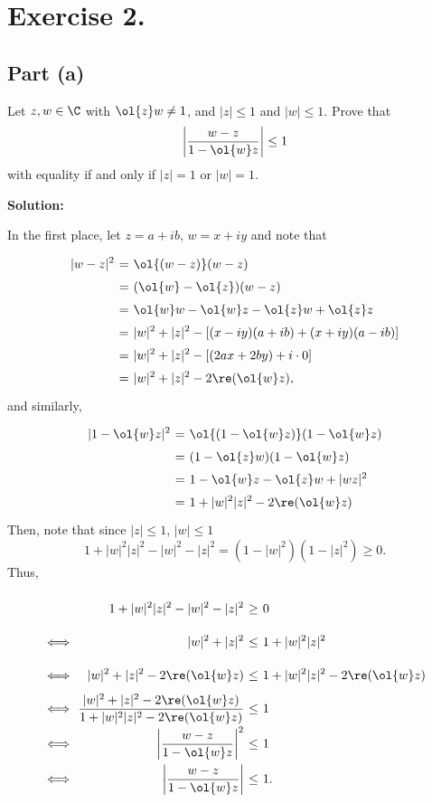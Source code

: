 \section*{Exercise 2.}
\subsection*{Part (a)}
Let $z,w \in \C$ with $\ol{z} w \neq 1$, and $|z| \leq 1$ and $|w| \leq 1$. Prove that
\[ \left| \frac{w-z}{1-\ol{w}z} \right| \leq 1\]
with equality if and only if $|z| = 1$ or $|w| = 1$.

\textbf{Solution:}

In the first place, let $z = a+ib$, $w = x+iy$ and note that 
\[ \everymath{\displaystyle}
\arraycolsep=1.8pt\def\arraystretch{1.5}
\begin{array}{rcl}
    |w-z|^2  & = & \ol{(w-z)} (w-z) \\
    & = & (\ol{w}-\ol{z})(w-z)\\
    & = & \ol{w}w - \ol{w}z - \ol{z}w + \ol{z}z\\
    & = & |w|^2 + |z|^2 - [(x-iy)(a+ib) + (x+iy)(a-ib) ]\\
    & = & |w|^2 + |z|^2 - [(2ax+2by) + i\cdot 0 ]\\
    & = & |w|^2 + |z|^2 - 2 \re(\ol{w} z),
\end{array}
\]
and similarly, 
\[ \everymath{\displaystyle}
\arraycolsep=1.8pt\def\arraystretch{1.5}
\begin{array}{rcl}
    |1-\ol{w}z|^2  & = & \ol{(1-\ol{w}z)} (1-\ol{w}z) \\
    & = & (1-\ol{z}w)(1-\ol{w}z)\\
    & = & 1 - \ol{w}z - \ol{z}w + |wz|^2\\
    & = & 1 + |w|^2|z|^2 - 2 \re(\ol{w} z)
\end{array}
\]
Then, note that since $|z| \leq 1$, $|w| \leq 1$
\[ 1+ |w|^2|z|^2 - |w|^2 - |z|^2 = (1 - |w|^2)(1 - |z|^2) \geq 0. \]
Thus,
\[ \everymath{\displaystyle}
\arraycolsep=1.8pt\def\arraystretch{2.2}
\begin{array}{rrcl}
    & 1+ |w|^2|z|^2 - |w|^2 - |z|^2 & \geq & 0\\
    \iff &|w|^2 + |z|^2 & \leq & 1+ |w|^2|z|^2\\
    \iff & |w|^2 + |z|^2 - 2 \re(\ol{w} z) & \leq & 1+ |w|^2|z|^2 - 2 \re(\ol{w} z)\\
    \iff & \frac{|w|^2 + |z|^2 - 2 \re(\ol{w} z)}{1+ |w|^2|z|^2 - 2 \re(\ol{w} z)} & \leq & 1\\
    \iff & \left| \frac{w-z}{1-\ol{w}z} \right|^2 & \leq & 1\\
    \iff & \left| \frac{w-z}{1-\ol{w}z} \right| & \leq & 1.\\
\end{array} \]

